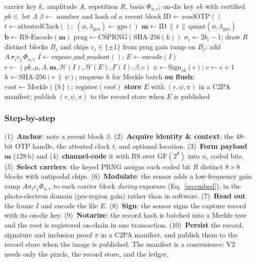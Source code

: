 \documentclass[journal]{IEEEtran}
\newcommand{\pr}{\textup{\textsc{PixelRoot}}}
\begin{document}
\begin{algorithm}[t]
\caption{\pr{} capture-time embed, sign, and notarize}
\label{alg:capture}
\begin{algorithmic}[1]
\REQUIRE carrier key $k$, amplitude $A$, repetition $R$, basis $\Phi_{u,v}$;
         on-die key $\mathit{sk}$ with certified $\mathit{pk}\in$ lot $\Lambda$
\STATE $\beta\gets$ number and hash of a recent block 
\STATE $\mathrm{ID}\gets\mathrm{readOTP}()$ 
\STATE $t\gets\mathrm{attestedClock}();\;(\phi,\lambda_{\mathrm{geo}})\gets\mathrm{gps}()$
\STATE $\mathbf{m}\gets \mathrm{ID}\,\|\,t\,\|\,\mathrm{quant}(\phi,\lambda_{\mathrm{geo}})$ 
\STATE $\mathbf{b}\gets \mathrm{RS\text{-}Encode}(\mathbf{m})$ 
\STATE $\mathrm{prng}\gets\mathrm{CSPRNG}(\mathrm{SHA\text{-}256}(k))$
   \STATE $\sigma_i\gets 2b_i-1$; draw $R$ distinct blocks $B_j$ and chips $c_j\in\{\pm1\}$ from prng
     \STATE gain ramp on $B_j$: add $A\,\sigma_i c_j\,\Phi_{u,v}$
   \ENDFOR
\ENDFOR
\STATE $I\gets \mathrm{expose\_and\_readout}()$;\; $E\gets\mathrm{encode}(I)$
\STATE $r\gets(\mathit{pk},\mu,\Lambda,\mathbf{m},\mathcal H(I),\mathcal H(E),F(I),\beta,c)$
\STATE $\psi\gets\mathrm{Sign}_{\mathit{sk}}(r)$;\; $c\gets c+1$
\STATE $h\gets \mathrm{SHA\text{-}256}(r\,\|\,\psi)$;\; enqueue $h$ for Merkle batch
\STATE \textbf{on flush:} $\mathit{root}\gets\mathrm{Merkle}(\{h\})$;\; $\mathrm{register}(\mathit{root})$
\STATE \textbf{store} $E$ with $(r,\psi,\pi)$ in a C2PA manifest; publish
       $(r,\psi,\pi)$ to the record store when $E$ is published
\end{algorithmic}
\end{algorithm}

\ifshort
\else
\subsubsection*{Step-by-step}
(1)~\textbf{Anchor}: note a recent block $\beta$. (2)~\textbf{Acquire identity \&
context}: the $48$-bit OTP handle, the attested clock $t$, and optional location.
(3)~\textbf{Form payload} $\mathbf{m}$ ($128$\,b) and (4)~\textbf{channel-code} it
with RS over $\mathrm{GF}(2^8)$ into $n_c$ coded bits. (5)~\textbf{Select
carriers}: the keyed PRNG assigns each coded bit $R$ distinct $8\!\times\!8$
blocks with antipodal chips. (6)~\textbf{Modulate}: the sensor adds a
low-frequency gain ramp $A\sigma_i c_j\Phi_{u,v}$ to each carrier block
\emph{during} exposure (Eq.~\ref{eq:embed}), in the photo-electron domain
(per-region gain) rather than in software. (7)~\textbf{Read out} the frame $I$
and encode the file $E$. (8)~\textbf{Sign}: the sensor signs the capture record
with its on-die key. (9)~\textbf{Notarize}: the record hash is batched into a
Merkle tree and the root is registered on-chain in one transaction.
(10)~\textbf{Persist} the record, signature and inclusion proof $\pi$ in a C2PA
manifest, and publish them to the record store when the image is published. The
manifest is a convenience: V2 needs only the pixels, the record store, and the
ledger.
\end{document}
